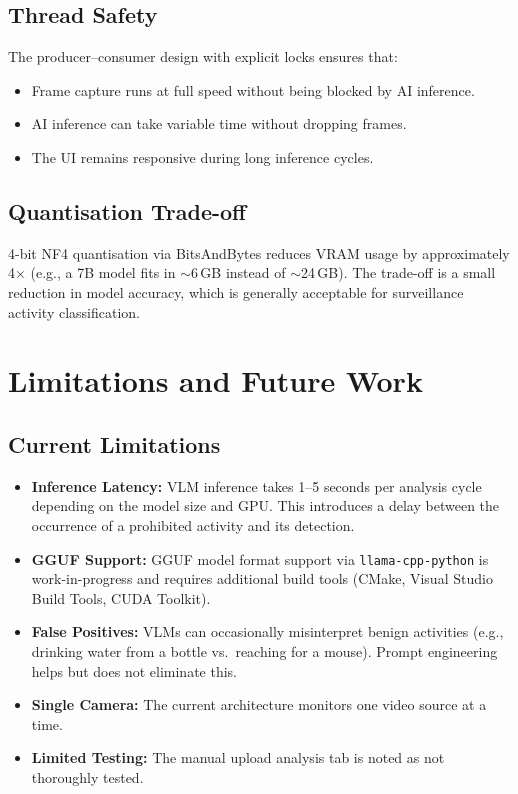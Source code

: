 \documentclass[12pt,a4paper]{article}
\begin{document}
\subsection{Thread Safety}

The producer--consumer design with explicit locks ensures that:

\begin{itemize}[noitemsep]
    \item Frame capture runs at full speed without being blocked by AI inference.
    \item AI inference can take variable time without dropping frames.
    \item The UI remains responsive during long inference cycles.
\end{itemize}

\subsection{Quantisation Trade-off}

4-bit NF4 quantisation via BitsAndBytes reduces VRAM usage by approximately 4$\times$ (e.g., a 7B model fits in $\sim$6\,GB instead of $\sim$24\,GB). The trade-off is a small reduction in model accuracy, which is generally acceptable for surveillance activity classification.

\section{Limitations and Future Work}

\subsection{Current Limitations}

\begin{itemize}
    \item \textbf{Inference Latency:} VLM inference takes 1--5 seconds per analysis cycle depending on the model size and GPU. This introduces a delay between the occurrence of a prohibited activity and its detection.
    \item \textbf{GGUF Support:} GGUF model format support via \texttt{llama-cpp-python} is work-in-progress and requires additional build tools (CMake, Visual Studio Build Tools, CUDA Toolkit).
    \item \textbf{False Positives:} VLMs can occasionally misinterpret benign activities (e.g., drinking water from a bottle vs.\ reaching for a mouse). Prompt engineering helps but does not eliminate this.
    \item \textbf{Single Camera:} The current architecture monitors one video source at a time.
    \item \textbf{Limited Testing:} The manual upload analysis tab is noted as not thoroughly tested.
\end{itemize}
\end{document}
